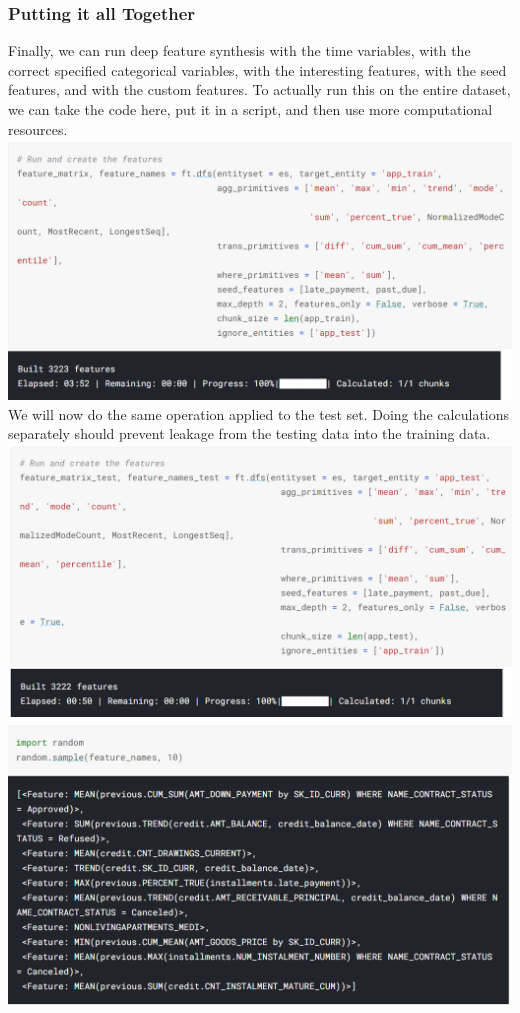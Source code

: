 \documentclass[twoside,a4paper]{article}
\begin{document}
\subsubsection{Putting it all Together}
Finally, we can run deep feature synthesis with the time variables, with the correct specified categorical variables, with the interesting features, with the seed features, and with the custom features. To actually run this on the entire dataset, we can take the code here, put it in a script, and then use more computational resources.\\
\includegraphics[scale=.7]{29.png}\\
We will now do the same operation applied to the test set. Doing the calculations separately should prevent leakage from the testing data into the training data.\\
\includegraphics[scale=.7]{30.png}\\
\includegraphics[scale=.7]{31.png}\\
\end{document}
